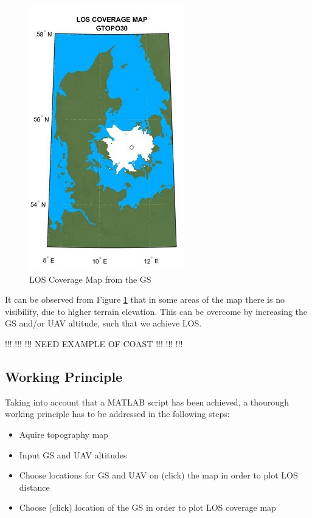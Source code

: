 \begin{figure}[h]
	\centering
	\includegraphics[scale=2.5]{figures/coverage_map.jpg}
	\caption{LOS Coverage Map from the GS}
   	\label{fig:los_area}
\end{figure}

It can be observed from Figure \ref{fig:los_area} that in some areas of the map there is no visibility, due to higher terrain elevation. This can be overcome by increasing the GS and/or UAV altitude, such that we achieve LOS.  


!!! !!! !!! NEED EXAMPLE OF COAST !!! !!! !!!

\subsection{Working Principle}
Taking into account that a MATLAB script has been achieved, a thourough working principle has to be addressed in the following steps:
\begin{itemize}
	\item Aquire topography map 
	\item Input GS and UAV altitudes
	\item Choose locations for GS and UAV on (click) the map in order to plot LOS distance
	\item Choose (click) location of the GS in order to plot LOS coverage map
\end{itemize}